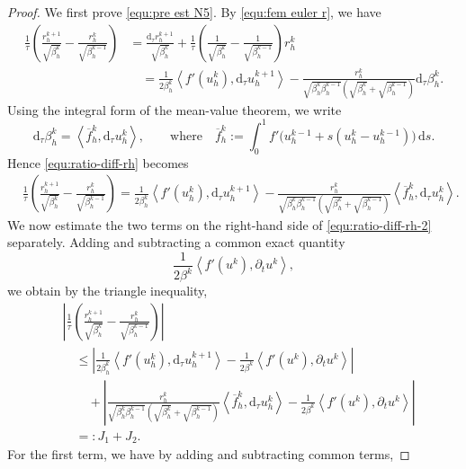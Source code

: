 \documentclass[10pt,a4paper]{amsart}
\newcommand{\abs}[1]{\left|{#1}\right|}
\newcommand{\ds}{\mathrm{d}s}
\newcommand{\dtt}{\mathrm{d}_\tau}
\newcommand{\inpro}[2]{\left\langle#1,#2\right\rangle}
\begin{document}
\begin{proof}
	We first prove \eqref{equ:pre est N5}. By \eqref{equ:fem euler r}, we have
	\begin{align}
		\frac{1}{\tau}
		\left(
		\frac{r_h^{k+1}}{\sqrt{\beta_h^k}}
		-
		\frac{r_h^k}{\sqrt{\beta_h^{k-1}}}
		\right)
		&=
		\frac{\dtt r_h^{k+1}}{\sqrt{\beta_h^k}}
		+
		\frac{1}{\tau}
		\left(
		\frac{1}{\sqrt{\beta_h^k}}
		-
		\frac{1}{\sqrt{\beta_h^{k-1}}}
		\right) r_h^k
		\nonumber\\
		&\quad
		=
		\frac{1}{2\beta_h^k}
		\inpro{f'(u_h^k)}{\dtt u_h^{k+1}}
		-
		\frac{r_h^k}{\sqrt{\beta_h^k\beta_h^{k-1}}
			(\sqrt{\beta_h^k}+\sqrt{\beta_h^{k-1}})}
		\dtt\beta_h^k .
		\label{equ:ratio-diff-rh}
	\end{align}
	Using the integral form of the mean-value theorem, we write
	\[
	\dtt\beta_h^k
	=
	\inpro{\overline f_h^k}{\dtt u_h^k},
	\qquad \text{where}\quad
	\overline f_h^k
	:=
	\int_0^1
	f'\big(u_h^{k-1}+s(u_h^k-u_h^{k-1})\big)\,\ds .
	\]
	Hence \eqref{equ:ratio-diff-rh} becomes
	\begin{align}
		&\frac{1}{\tau}
		\left(
		\frac{r_h^{k+1}}{\sqrt{\beta_h^k}}
		-
		\frac{r_h^k}{\sqrt{\beta_h^{k-1}}}
		\right)
		=
		\frac{1}{2\beta_h^k}
		\inpro{f'(u_h^k)}{\dtt u_h^{k+1}}
		-
		\frac{r_h^k}{\sqrt{\beta_h^k\beta_h^{k-1}}
			(\sqrt{\beta_h^k}+\sqrt{\beta_h^{k-1}})}
		\inpro{\overline f_h^k}{\dtt u_h^k}.
		\label{equ:ratio-diff-rh-2}
	\end{align}
	We now estimate the two terms on the right-hand side of
	\eqref{equ:ratio-diff-rh-2} separately. Adding and subtracting a common exact
	quantity
	\[
	\frac{1}{2\beta^k}
	\inpro{f'(u^k)}{\partial_t u^k},
	\]
	we obtain by the triangle inequality,
	\begin{align}
		&\abs{
			\frac{1}{\tau}
			\left(
			\frac{r_h^{k+1}}{\sqrt{\beta_h^k}}
			-
			\frac{r_h^k}{\sqrt{\beta_h^{k-1}}}
			\right)}
		\nonumber\\
		&\quad
		\leq
		\abs{
			\frac{1}{2\beta_h^k}
			\inpro{f'(u_h^k)}{\dtt u_h^{k+1}}
			-
			\frac{1}{2\beta^k}
			\inpro{f'(u^k)}{\partial_t u^k}
		}
		\nonumber\\
		&\qquad
		+
		\abs{
			\frac{r_h^k}{\sqrt{\beta_h^k\beta_h^{k-1}}
				(\sqrt{\beta_h^k}+\sqrt{\beta_h^{k-1}})}
			\inpro{\overline f_h^k}{\dtt u_h^k}
			-
			\frac{1}{2\beta^k}
			\inpro{f'(u^k)}{\partial_t u^k}
		}
		\nonumber\\
		&\quad
		=: J_1+J_2 .
		\label{equ:J1-J2-ratio}
	\end{align}
	For the first term, we have by adding and subtracting common terms,

\end{proof}
\end{document}
